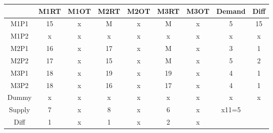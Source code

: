 \documentclass{article}%
\begin{document}
\begin{tabular}{c|c|ccccccc}
    & M1RT & M1OT & M2RT & M2OT & M3RT & M3OT & Demand               & Diff                 \\
    \midrule
    M1P1   & 15   & x    & M    & x    & M    & x    & 5                    & 15                   \\
    \cmidrule{2-9}
    M1P2   & x    & x    & x    & x    & x    & x    & x                    & x                    \\
    M2P1   & 16   & x    & 17   & x    & M    & x    & 3                    & 1                    \\
    M2P2   & 17   & x    & 15   & x    & M    & x    & 5                    & 2                    \\
    M3P1   & 18   & x    & 19   & x    & 19   & x    & 4                    & 1                    \\
    M3P2   & 18   & x    & 16   & x    & 17   & x    & 4                    & 1                    \\
    Dummy  & x    & x    & x    & x    & x    & x    & x                    & x                    \\
    Supply & 7    & x    & 8    & x    & 6    & x    & x11=5                &                      \\
    Diff   & 1    & x    & 1    & x    & 2    & x    &                      &                      \\
\end{tabular}
\newline
\newline
\end{document}
